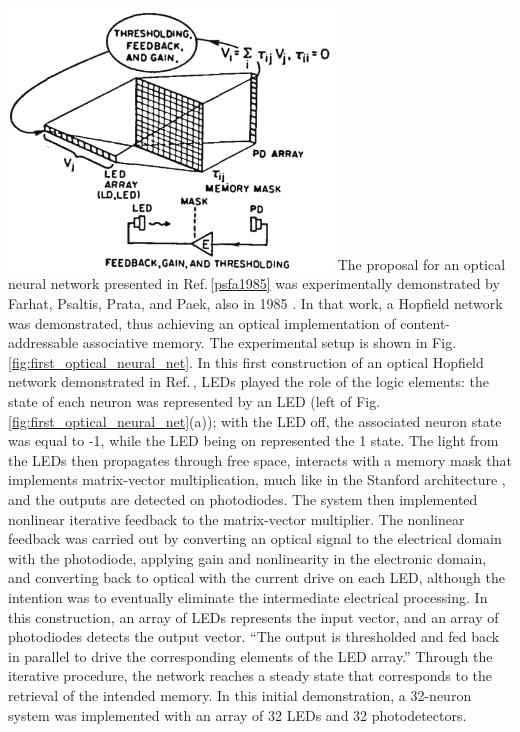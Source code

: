 \includegraphics[width=8.6cm]{figures/_first_optical_neural_net.pdf}
The proposal for an optical neural network presented in Ref.\,\ref{psfa1985} was experimentally demonstrated by Farhat, Psaltis, Prata, and Paek, also in 1985 \cite{faps1985}. In that work, a Hopfield network was demonstrated, thus achieving an optical implementation of content-addressable associative memory. The experimental setup is shown in Fig.\,\ref{fig:first_optical_neural_net}. In this first construction of an optical Hopfield network demonstrated in Ref.\,\cite{faps1985}, LEDs played the role of the logic elements: the state of each neuron was represented by an LED (left of Fig.\,\ref{fig:first_optical_neural_net}(a)); with the LED off, the associated neuron state was equal to -1, while the LED being on represented the 1 state. The light from the LEDs then propagates through free space, interacts with a memory mask that implements matrix-vector multiplication, much like in the Stanford architecture \cite{godi1978}, and the outputs are detected on photodiodes. The system then implemented nonlinear iterative feedback to the matrix-vector multiplier. The nonlinear feedback was carried out by converting an optical signal to the electrical domain with the photodiode, applying gain and nonlinearity in the electronic domain, and converting back to optical with the current drive on each LED, although the intention was to eventually eliminate the intermediate electrical processing. In this construction, an array of LEDs represents the input vector, and an array of photodiodes detects the output vector. ``The output is thresholded and fed back in parallel to drive the corresponding elements of the LED array.'' Through the iterative procedure, the network reaches a steady state that corresponds to the retrieval of the intended memory. In this initial demonstration, a 32-neuron system was implemented with an array of 32 LEDs and 32 photodetectors. 

